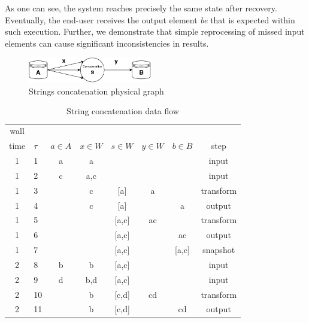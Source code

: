 As one can see, the system reaches precisely the same state after recovery. Eventually, the end-user receives the output element {\em be} that is expected within such execution. Further, we demonstrate that simple reprocessing of missed input elements can cause significant inconsistencies in results.

\begin{figure}[htbp]
  \centering
  \includegraphics[width=0.48\textwidth]{Chapters/DeliveryGuarantees/pics/concat.pdf}
  \caption{Strings concatenation physical graph}
  \label{concat}
\end{figure}

\begin{table}[htbp]
\begin {center}
\caption{String concatenation data flow}   
\begin{tabular}{c|l|c|c|c|c|c|c}      
wall\\ time & $\tau$& $a\in A$  &$x\in W$& $s\in W$ & $y\in W$ & $b \in B$ & step  \\
\hline
1   &   1   &   a   &   a           &           &       &           &   input \\
1   &   2   &   c   &   a,c         &           &       &           &   input \\
1   &   3   &       &    c          &   [a]     &    a  &           &   transform \\
1   &   4   &       &   c           &   [a]     &       &   a       &   output \\
1   &   5   &       &               &   [a,c]   &   ac  &           &   transform \\
1   &   6   &       &               &   [a,c]   &       &   ac       &   output \\
1   &   7   &       &               &   [a,c]   &       &   [a,c]   &   snapshot \\
2   &   8   &   b    &   b          &   [a,c]   &       &           &   input \\
2   &   9   &   d    &   b,d        &   [a,c]   &       &           &   input \\
2   &   10   &       &   b          &   [c,d]   &  cd   &           &   transform \\
2   &   11   &       &   b          &   [c,d]   &       &      cd     &   output \\

\end{tabular}
\end{center}
\end{table}
